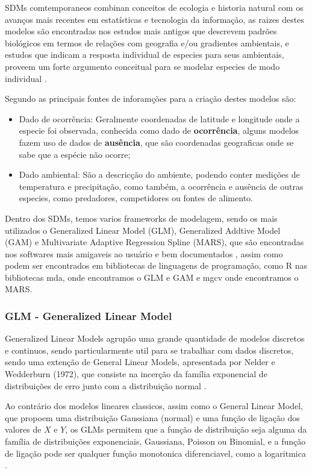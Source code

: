 \documentclass[
	12pt,				%
	openright,			%
	oneside,			%
	a4paper,			%
	english,			%
	brazil				%
	]{abntex2}
\begin{document}
SDMs comtemporaneos combinan conceitos de ecologia e historia natural com os avanços mais recentes em estatísticas e
tecnologia da informação, as raizes destes modelos são encontradas nos estudos mais antigos que descrevem padrões
biológicos em termos de relações com geografia e/ou gradientes ambientais, e estudos que indicam a resposta individual
de especies para seus ambientais, proveem um forte argumento conceitual para se modelar especies de modo individual 
\cite{speciesDistributionModels}.

Segundo \cite{tiposDados_sdm} as principais fontes de inforamções para a criação destes modelos são: 
\begin{itemize}
	\item Dado de ocorrência: Geralmente coordenadas de latitude e longitude onde a especie foi observada, conhecida como
	dado de \textbf{ocorrência}, alguns modelos fazem uso de dados de \textbf{ausência}, que são coordenadas geograficas 
	onde se sabe que a espécie não ocorre;
	\item Dado ambiental: São a descricção do ambiente, podendo conter medições de temperatura e precipitação, como
	também, a ocorrência e ausência de outras especies, como predadores, competidores ou fontes de alimento.
\end{itemize}

Dentro dos SDMs, temos varios frameworks de modelagem, sendo os mais utilizados o Generalized Linear Model (GLM), 
Generalized Addtive Model (GAM) e Multivariate Adaptive Regression Spline (MARS), que são encontradas nos
softwares mais amigaveis ao usuário e bem documentados \cite{predPerform33models}, assim como podem ser encontrados em 
bibliotecas de linguagens de programação, como R nas bibliotecas mda, onde encontramos o GLM e GAM \cite{mda} e mgcv 
onde encontramos o MARS\cite{mgcv}.

\subsubsection{GLM - Generalized Linear Model}

Generalized Linear Models agrupão uma grande quantidade de modelos discretos e continuos, sendo particularmente util para se 
trabalhar com dados discretos, sendo uma extenção de General Linear Models, apresentada por Nelder e Wedderburn (1972), 
que consiste na incerção da família exponencial de distribuições de erro junto com a distribuição normal \cite{GLM}.

Ao contrário dos modelos lineares classicos, assim como o General Linear Model, que propoem uma distribuição Gaussiana (normal) 
e uma função de ligação dos valores de $X$ e $Y$, os GLMs permitem que a função de distribuição seja alguma da família de distribuições 
exponenciais, Gaussiana, Poisson ou Binomial, e a função de ligação pode ser qualquer função monotonica 
diferenciavel, como a logaritmica \cite{GAMeGLM_especie_estudo}.
\end{document}
